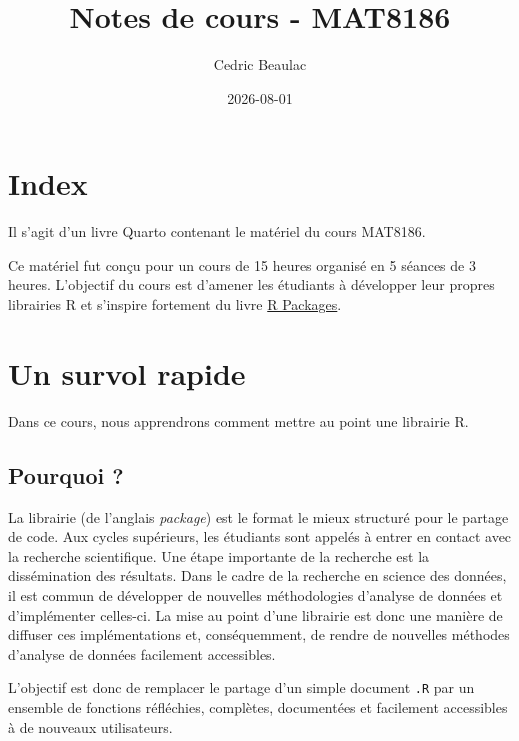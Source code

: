 \documentclass[
  letterpaper,
  DIV=11,
  numbers=noendperiod]{scrreprt}
\title{Notes de cours - MAT8186}
\author{Cedric Beaulac}
\date{2026-08-01}
\renewcommand*\contentsname{Table of contents}
\newcommand\contentsname{Table of contents}
\begin{document}
\maketitle

\renewcommand*\contentsname{Table of contents}
{
\hypersetup{linkcolor=}
\setcounter{tocdepth}{2}
\tableofcontents
}

\chapter*{Index}\label{index}


Il s'agit d'un livre Quarto contenant le matériel du cours MAT8186.

Ce matériel fut conçu pour un cours de 15 heures organisé en 5 séances
de 3 heures. L'objectif du cours est d'amener les étudiants à développer
leur propres librairies R et s'inspire fortement du livre
\href{https://r-pkgs.org}{R Packages}.


\chapter{Un survol rapide}\label{un-survol-rapide}

Dans ce cours, nous apprendrons comment mettre au point une librairie R.

\section*{Pourquoi ?}\label{pourquoi}


La librairie (de l'anglais \emph{package}) est le format le mieux
structuré pour le partage de code. Aux cycles supérieurs, les étudiants
sont appelés à entrer en contact avec la recherche scientifique. Une
étape importante de la recherche est la dissémination des résultats.
Dans le cadre de la recherche en science des données, il est commun de
développer de nouvelles méthodologies d'analyse de données et
d'implémenter celles-ci. La mise au point d'une librairie est donc une
manière de diffuser ces implémentations et, conséquemment, de rendre de
nouvelles méthodes d'analyse de données facilement accessibles.

L'objectif est donc de remplacer le partage d'un simple document
\texttt{.R} par un ensemble de fonctions réfléchies, complètes,
documentées et facilement accessibles à de nouveaux utilisateurs.
\end{document}
